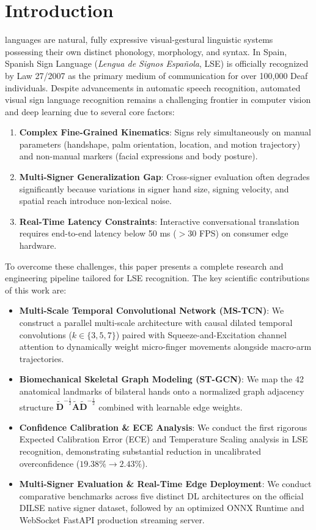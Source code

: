 \documentclass[journal,compsoc]{IEEEtran}
\begin{document}
\section{Introduction}
 languages are natural, fully expressive visual-gestural linguistic systems possessing their own distinct phonology, morphology, and syntax. In Spain, Spanish Sign Language (\textit{Lengua de Signos Espa\~nola}, LSE) is officially recognized by Law 27/2007 as the primary medium of communication for over 100,000 Deaf individuals. Despite advancements in automatic speech recognition, automated visual sign language recognition remains a challenging frontier in computer vision and deep learning due to several core factors:

\begin{enumerate}
    \item \textbf{Complex Fine-Grained Kinematics}: Signs rely simultaneously on manual parameters (handshape, palm orientation, location, and motion trajectory) and non-manual markers (facial expressions and body posture).
    \item \textbf{Multi-Signer Generalization Gap}: Cross-signer evaluation often degrades significantly because variations in signer hand size, signing velocity, and spatial reach introduce non-lexical noise.
    \item \textbf{Real-Time Latency Constraints}: Interactive conversational translation requires end-to-end latency below 50 ms ($>30$ FPS) on consumer edge hardware.
\end{enumerate}

To overcome these challenges, this paper presents a complete research and engineering pipeline tailored for LSE recognition. The key scientific contributions of this work are:

\begin{itemize}
    \item \textbf{Multi-Scale Temporal Convolutional Network (MS-TCN)}: We construct a parallel multi-scale architecture with causal dilated temporal convolutions ($k \in \{3, 5, 7\}$) paired with Squeeze-and-Excitation channel attention to dynamically weight micro-finger movements alongside macro-arm trajectories.
    \item \textbf{Biomechanical Skeletal Graph Modeling (ST-GCN)}: We map the 42 anatomical landmarks of bilateral hands onto a normalized graph adjacency structure $\mathbf{\tilde{D}}^{-\frac{1}{2}} \mathbf{\tilde{A}} \mathbf{\tilde{D}}^{-\frac{1}{2}}$ combined with learnable edge weights.
    \item \textbf{Confidence Calibration & ECE Analysis}: We conduct the first rigorous Expected Calibration Error (ECE) and Temperature Scaling analysis in LSE recognition, demonstrating substantial reduction in uncalibrated overconfidence ($19.38\% \to 2.43\%$).
    \item \textbf{Multi-Signer Evaluation & Real-Time Edge Deployment}: We conduct comparative benchmarks across five distinct DL architectures on the official DILSE native signer dataset, followed by an optimized ONNX Runtime and WebSocket FastAPI production streaming server.
\end{itemize}
\end{document}
